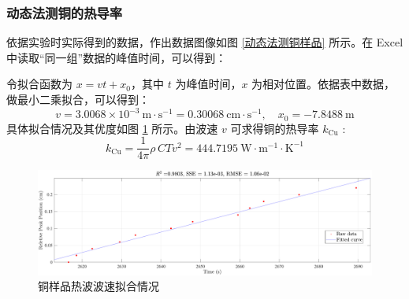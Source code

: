 \documentclass[UTF8]{article}
\theoremstyle{MyLineTheoremStyle} %
\theoremstyle{MyBlockTheoremStyle} %
\theoremstyle{MySubsubsectionStyle} %
\begin{document}
\subsubsection{动态法测铜的热导率}
依据实验时实际得到的数据，作出数据图像如图 \ref{动态法测铜样品} 所示。在 Excel 中读取“同一组”数据的峰值时间，可以得到：
\begin{table}[H]\centering
    \caption{铜样品不同测量点的峰值时间}
    \label{铜样品不同测量点的峰值时间}
\end{table}
令拟合函数为 $x = v t +  x_0$，其中 $t$ 为峰值时间，$x$ 为相对位置。依据表中数据，做最小二乘拟合，可以得到：
\begin{equation}
v = 3.0068 \times 10 ^{-3}\ \mathrm{m\cdot s^{-1}} = 0.30068 \ \mathrm{cm\cdot s^{-1}} ,\quad x_0 = -7.8488 \ \mathrm{m}
\end{equation}
具体拟合情况及其优度如图 \ref{铜样品热波波速拟合情况} 所示。由波速 $v$ 可求得铜的热导率 $k_{\text{Cu}} $ : 
\begin{equation}
k_{\text{Cu}} = \frac{1}{4 \pi} \rho \,C T v^2 = 444.7195 \ \mathrm{W\cdot m^{-1}\cdot K^{-1}}
\end{equation}


\begin{figure}[H]\centering
    \includegraphics[width=\columnwidth]{assets/1 铜/2024-12-10_21-15-35.pdf}
    \caption{铜样品热波波速拟合情况}
    \label{铜样品热波波速拟合情况}
\end{figure}
\end{document}
